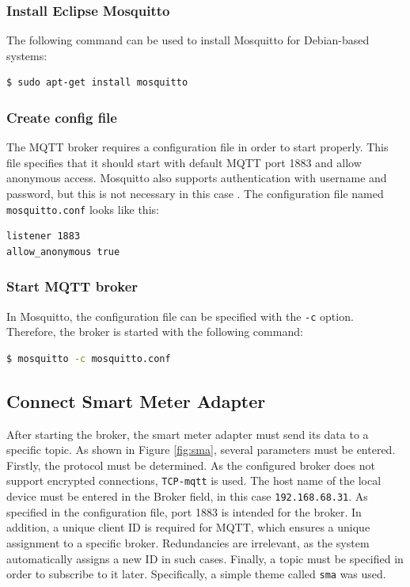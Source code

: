 \subsubsection{Install Eclipse Mosquitto} The following command can be used to install Mosquitto for Debian-based systems:

\begin{lstlisting}[language=bash]
$ sudo apt-get install mosquitto
\end{lstlisting}

\subsubsection{Create config file} The MQTT broker requires a configuration file in order to start properly. This file specifies that it should start with default MQTT port 1883 and allow anonymous access. Mosquitto also supports authentication with username and password, but this is not necessary in this case \cite{mosquitto}. The configuration file named \lstinline{mosquitto.conf} looks like this:

\begin{lstlisting}
listener 1883
allow_anonymous true
\end{lstlisting}

\subsubsection{Start MQTT broker} In Mosquitto, the configuration file can be specified with the \lstinline{-c} option. Therefore, the broker is started with the following command:

\begin{lstlisting}[language=bash]
$ mosquitto -c mosquitto.conf
\end{lstlisting}

\subsection{Connect Smart Meter Adapter}

After starting the broker, the smart meter adapter must send its data to a specific topic. As shown in Figure \ref{fig:sma}, several parameters must be entered. Firstly, the protocol must be determined. As the configured broker does not support encrypted connections, \lstinline{TCP-mqtt} is used. The host name of the local device must be entered in the Broker field, in this case \lstinline{192.168.68.31}. As specified in the configuration file, port 1883 is intended for the broker. In addition, a unique client ID is required for MQTT, which ensures a unique assignment to a specific broker. Redundancies are irrelevant, as the system automatically assigns a new ID in such cases. Finally, a topic must be specified in order to subscribe to it later. Specifically, a simple theme called \lstinline{sma} was used.

